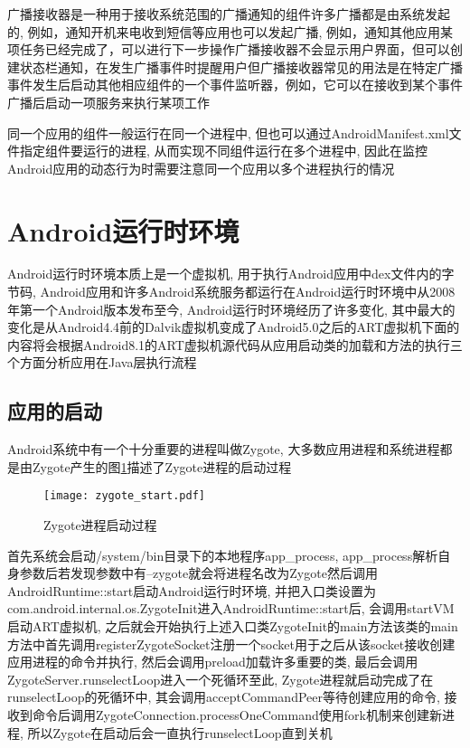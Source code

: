 广播接收器是一种用于接收系统范围的广播通知的组件\juhao 许多广播都是由系统发起的, 例如，通知开机\dunhao 来电\dunhao 收到短信等\juhao 应用也可以发起广播, 例如，通知其他应用某项任务已经完成了，可以进行下一步操作\juhao 广播接收器不会显示用户界面，但可以创建状态栏通知，在发生广播事件时提醒用户\juhao 但广播接收器常见的用法是在特定广播事件发生后启动其他相应组件的一个事件监听器，例如，它可以在接收到某个事件广播后启动一项服务来执行某项工作\juhao

同一个应用的组件一般运行在同一个进程中, 但也可以通过AndroidManifest.xml文件指定组件要运行的进程, 从而实现不同组件运行在多个进程中, 因此在监控Android应用的动态行为时需要注意同一个应用以多个进程执行的情况\juhao 

\section{Android运行时环境}
\label{androidRuntime}
Android运行时环境本质上是一个虚拟机, 用于执行Android应用中dex文件内的字节码, Android应用和许多Android系统服务都运行在Android运行时环境中\juhao 从2008年第一个Android版本发布至今, Android运行时环境经历了许多变化, 其中最大的变化是从Android4.4前的Dalvik虚拟机变成了Android5.0之后的ART虚拟机\juhao 下面的内容将会根据Android8.1的ART虚拟机源代码从应用启动\dunhao 类的加载和方法的执行\dunhao 三个方面分析应用在Java层执行流程\juhao

\subsection{应用的启动}
\label{appStartA}
Android系统中有一个十分重要的进程叫做Zygote, 大多数应用进程和系统进程都是由Zygote产生的\juhao 图\ref{zygoteStart}描述了Zygote进程的启动过程\juhao
\begin{figure}[ht]
	\centering
	\texttt{[image: zygote\_start.pdf]}
	\caption{Zygote进程启动过程}
	\label{zygoteStart}
\end{figure}

首先系统会启动/system/bin目录下的本地程序app\_process, app\_process解析自身参数后若发现参数中有--zygote就会将进程名改为Zygote然后调用AndroidRuntime::start启动Android运行时环境, 并把入口类设置为com.android.internal.os.ZygoteInit\juhao 进入AndroidRuntime::start后, 会调用startVM启动ART虚拟机, 之后就会开始执行上述入口类ZygoteInit的main方法\juhao 该类的main方法中首先调用registerZygoteSocket注册一个socket用于之后从该socket接收创建应用进程的命令并执行, 然后会调用preload加载许多重要的类, 最后会调用ZygoteServer.runselectLoop进入一个死循环\juhao 至此, Zygote进程就启动完成了\juhao 在runselectLoop的死循环中, 其会调用acceptCommandPeer等待创建应用的命令, 接收到命令后调用ZygoteConnection.processOneCommand使用fork机制来创建新进程, 所以Zygote在启动后会一直执行runselectLoop直到关机\juhao

